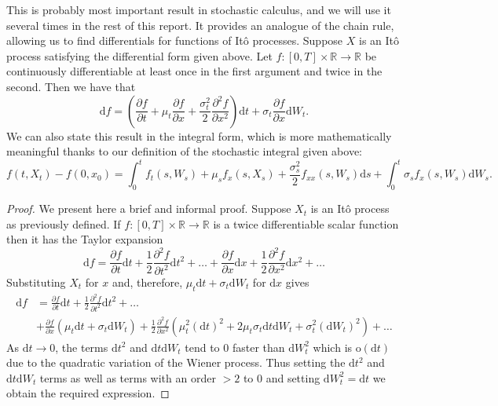 \begin{lemma}[It\^{o}'s Lemma]
    This is probably most important result in stochastic calculus, and we will use 
    it several times in the rest of this report. It provides an analogue of the 
    chain rule, allowing us to find differentials for functions of It\^{o} processes. 
    Suppose $X$ is an It\^{o} process satisfying the differential form given above. 
    Let $f:[0,T]\times\mathbb{R}\rightarrow\mathbb{R}$ be continuously differentiable 
    at least once in the first argument and twice in the second. Then we have that
    \begin{equation}\label{eq:1.25}
        \mathrm df=\left(\frac{\partial f}{\partial t}+\mu_t\frac{\partial f}{\partial x}+\frac{\sigma_t^2}{2}\frac{\partial^2 f}{\partial x^2}\right)\mathrm dt + \sigma_t\frac{\partial f}{\partial x}\mathrm dW_t.
    \end{equation}
    We can also state this result in the integral form, which is more mathematically 
    meaningful thanks to our definition of the stochastic integral given above:
    \begin{equation}\label{eq:1.26}
        f(t,X_t)-f(0,x_0)=\int_0^tf_t(s,W_s)+\mu_sf_x(s,X_s)+\frac{\sigma_s^2}{2}f_{xx}(s,W_s)\mathrm ds+\int_0^t\sigma_sf_x(s,W_s)\mathrm dW_s.
    \end{equation}
\end{lemma}
\begin{proof}
    We present here a brief and informal proof. Suppose $X_t$ is an It\^{o} process
    as previously defined. If $f:[0,T]\times\mathbb{R}\rightarrow\mathbb{R}$ is a 
    twice differentiable scalar function then it has the Taylor expansion
    \begin{equation*}
        \mathrm df = \frac{\partial f}{\partial t}\mathrm dt+\frac{1}{2}\frac{\partial^2f}{\partial t^2}\mathrm dt^2+\dots+\frac{\partial f}{\partial x}\mathrm dx+\frac{1}{2}\frac{\partial^2f}{\partial x^2}\mathrm dx^2+\dots
    \end{equation*}
    Substituting $X_t$ for $x$ and, therefore, $\mu_t\mathrm dt + \sigma_t\mathrm dW_t$
    for $\mathrm dx$ gives
    \begin{align*}
        \mathrm df &= \frac{\partial f}{\partial t}\mathrm dt+\frac{1}{2}\frac{\partial^2f}{\partial t^2}\mathrm dt^2+\dots\\
        &+\frac{\partial f}{\partial x}(\mu_t\mathrm dt + \sigma_t\mathrm dW_t)+\frac{1}{2}\frac{\partial^2f}{\partial x^2}(\mu_t^2(\mathrm dt)^2 + 2\mu_t\sigma_t\mathrm dt\mathrm dW_t+ \sigma_t^2(\mathrm dW_t)^2)+\dots
    \end{align*}
    As $\mathrm dt\rightarrow0$, the terms $\mathrm dt^2$ and $\mathrm dt\mathrm dW_t$ 
    tend to 0 faster than $\mathrm dW_t^2$ which is $\textrm{o}(\mathrm dt)$ due to
    the quadratic variation of the Wiener process. Thus setting the $\mathrm dt^2$ 
    and $\mathrm dt\mathrm dW_t$ terms as well as terms with an order $>2$ to 0
    and setting $\mathrm dW_t^2=\mathrm dt$ we obtain the required expression.
\end{proof}

